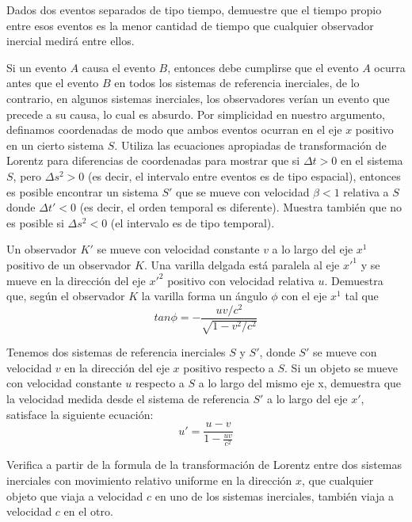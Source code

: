 \documentclass[12pt]{article}
\newenvironment{exercise}[2][Ejercicio]{\begin{trivlist} 
\item[\hskip \labelsep {\bfseries #1}\hskip \labelsep {\bfseries #2.}]}{\end{trivlist}}
\begin{document}
\begin{exercise}{1.10}
Dados dos eventos separados de tipo tiempo, demuestre que el tiempo propio entre esos eventos es la menor cantidad de tiempo que cualquier observador inercial medirá entre ellos.    
\end{exercise}

\begin{exercise}{1.11}
Si un evento $A$ causa el evento $B$, entonces debe cumplirse que el evento $A$ ocurra antes que el evento $B$ en todos los sistemas de referencia inerciales, de lo contrario, en algunos sistemas inerciales, los observadores verían un evento que precede a su causa, lo cual es absurdo. Por simplicidad en nuestro argumento, definamos coordenadas de modo que ambos eventos ocurran en el eje 
$x$ positivo en un cierto sistema $S$. Utiliza las ecuaciones apropiadas de transformación de Lorentz para diferencias de coordenadas para mostrar que si $\Delta t > 0$ en el sistema $S$, pero 
$\Delta s^2>0$ (es decir, el intervalo entre eventos es de tipo espacial), entonces es posible encontrar un sistema $S'$ que se mueve con velocidad $\beta < 1$ relativa a $S$ donde $\Delta t' < 0$
 (es decir, el orden temporal es diferente). Muestra también que no es posible si $\Delta s^2 < 0$ (el intervalo es de tipo temporal).
\end{exercise}

\begin{exercise}{1.12}
Un observador $K'$ se mueve con velocidad constante $v$ a lo largo del eje  $x^1$ positivo de un observador $K$. Una varilla delgada está paralela al eje $x'^1$ y se mueve en la dirección del eje 
$x'^2$ positivo con velocidad relativa $u$. Demuestra que, según el observador $K$ la varilla forma un ángulo $\phi$ con el eje $x^1$ tal que
\[
tan\phi=-\frac{uv/c^2}{\sqrt{1-v^2/c^2}}
\]
\end{exercise}

\begin{exercise}{1.13} 
Tenemos dos sistemas de referencia inerciales $S$ y $S'$, donde $S'$ se mueve con velocidad $v$ en la dirección del eje $x$ positivo respecto a $S$. Si un objeto se mueve con velocidad constante $u$ respecto a $S$ a lo largo del mismo eje x, demuestra que la velocidad medida desde el sistema de referencia $S'$ a lo largo del eje $x'$, satisface la siguiente ecuación:
\[
u' = \frac{u - v}{1 - \frac{u v}{c^2}}
\]
\end{exercise}

\begin{exercise}{1.14} 
Verifica a partir de la formula de la transformación de Lorentz entre dos sistemas inerciales con movimiento relativo uniforme en la dirección $x$, que cualquier objeto que viaja a velocidad 
$c$ en uno de los sistemas inerciales, también viaja a velocidad $c$ en el otro.
\end{exercise}
\end{document}
